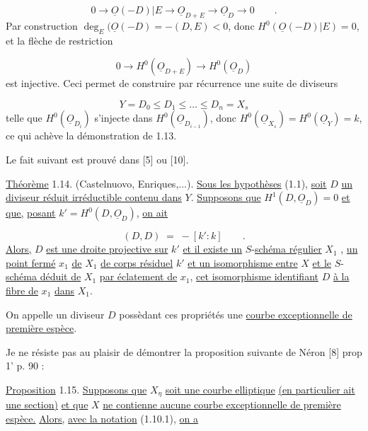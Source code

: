 \begin{equation*}
0 \longrightarrow \underline{O}(-D)|E \longrightarrow \underline{O}_{D+E} \longrightarrow \underline{O}_D \longrightarrow 0 \qquad .
\end{equation*}
Par construction $\deg_E(\underline{O}(-D) = - (D,E) < 0$, donc $H^0(\underline{O}(-D)|E) = 0$, et la flèche de restriction

\begin{equation*}
0 \longrightarrow H^0(\underline{O}_{D+E}) \longrightarrow H^0(\underline{O}_D)
\end{equation*}
est injective. Ceci permet de construire par récurrence une suite de diviseurs

\begin{equation*}
Y = D_0 \leq D_1 \leq \ldots \leq D_n = X_s
\end{equation*}
telle que $H^0(\underline{O}_{D_i})$ s'injecte dans $H^0(\underline{O}_{D_{i-1}})$, donc $H^0(\underline{O}_{X_s}) = H^0(\underline{O}_Y) = k$, ce qui achève la démonstration de 1.13.



Le fait suivant est prouvé dans [5] ou [10].

\underline{Théorème} 1.14. (Castelnuovo, Enriques,...). \underline{Sous les hypothèses} (1.1), \underline{soit} $D$ \underline{un diviseur réduit irréductible contenu dans} $Y$. \underline{Supposons que} $H^1(D,\underline{O}_D) = 0$ \underline{et que,} \underline{posant} $k' = H^0(D,\underline{O}_D)$, \underline{on ait}

\begin{equation*}
(D,D) \; = \; - [k' : k] \qquad .
\end{equation*}
\underline{Alors,} $D$ \underline{est une droite projective sur} $k'$ \underline{et il existe un} $S$-\underline{schéma régulier} $X_1$ , \underline{un point fermé} $x_1$ \underline{de} $X_1$ \underline{de corps résiduel} $k'$ \underline{et un isomorphisme entre} $X$ \underline{et le} $S$-\underline{schéma déduit de} $X_1$ \underline{par éclatement de} $x_1$, \underline{cet isomorphisme identifiant} $D$ \underline{à la fibre de} $x_1$ \underline{dans} $X_1$.

On appelle un diviseur $D$ possèdant ces propriétés une \underline{courbe exceptionnelle de première espèce}.

Je ne résiste pas au plaisir de démontrer la proposition suivante de Néron [8] prop 1' p. 90 :

\underline{Proposition} 1.15. \underline{Supposons que} $X_\eta$ \underline{soit une courbe elliptique} \underline{(en particulier ait une section)} \underline{et que} $X$ \underline{ne contienne aucune courbe exceptionnelle de première espèce.} \underline{Alors,} \underline{avec la notation} (1.10.1), \underline{on a}

